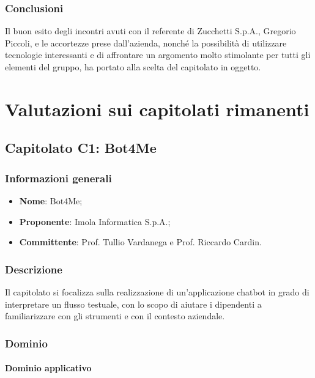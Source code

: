 \documentclass[11pt]{article}
\begin{document}
    \subsubsection{Conclusioni}
    Il buon esito degli incontri avuti con il referente di Zucchetti S.p.A., Gregorio Piccoli, e le accortezze prese dall'azienda,
    nonché la possibilità di utilizzare tecnologie interessanti e di affrontare un argomento molto stimolante per tutti gli elementi del
    gruppo, ha portato alla scelta del capitolato in oggetto.

\newpage


\section{Valutazioni sui capitolati rimanenti}

\subsection{Capitolato C1: Bot4Me}

    \subsubsection{Informazioni generali}
    \begin{itemize}
        \item \textbf{Nome}: Bot4Me;
        \item \textbf{Proponente}: Imola Informatica S.p.A.;
        \item \textbf{Committente}: Prof. Tullio Vardanega e Prof. Riccardo Cardin.
    \end{itemize}
    
    \subsubsection{Descrizione}
    Il capitolato si focalizza sulla realizzazione di un'applicazione chatbot in grado di interpretare un flusso testuale,
    con lo scopo di aiutare i dipendenti a familiarizzare con gli strumenti e con il contesto aziendale.
    
    
    \subsubsection{Dominio}
        \paragraph{Dominio applicativo}~\\
\end{document}
